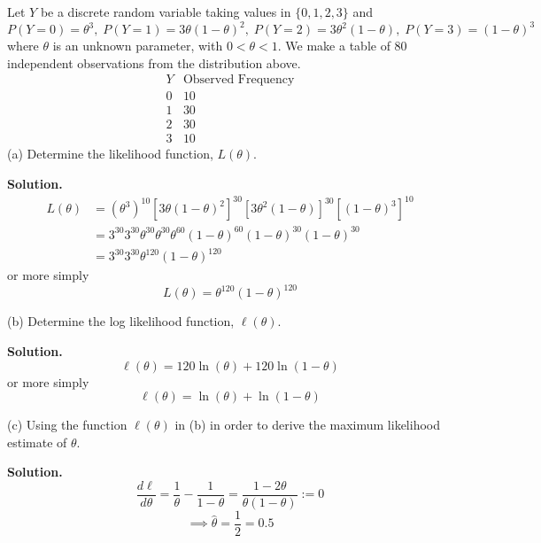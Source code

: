 \begin{exbox}
    \begin{example}
        Let $ Y $ be a discrete random variable taking values in $ \{0,1,2,3\} $ and
        \[ P(Y=0)=\theta^3,\; P(Y=1)=3\theta(1-\theta)^2,\;P(Y=2)=3\theta^2(1-\theta),\;
            P(Y=3)=(1-\theta)^3 \]
        where $ \theta $ is an unknown parameter, with $ 0<\theta<1 $.
        We make a table of $ 80 $ independent observations from the distribution above.
        \[
            \begin{array}{c|c}
                Y & \text{Observed Frequency} \\
                \hline
                0 & 10                        \\
                1 & 30                        \\
                2 & 30                        \\
                3 & 10
            \end{array}
        \]
        (a) Determine the likelihood function, $ L(\theta) $.

        \textbf{Solution.}
        \begin{align*}
            L(\theta)
             & =\left( \theta^3 \right)^{10}\left[ 3\theta(1-\theta)^2 \right]^{30}
            \left[ 3\theta^2(1-\theta) \right]^{30}\left[ (1-\theta)^3 \right]^{10}                        \\
             & =3^{30}3^{30}\theta^{30}\theta^{30}\theta^{60}(1-\theta)^{60}(1-\theta)^{30}(1-\theta)^{30} \\
             & =3^{30}3^{30}\theta^{120}(1-\theta)^{120}
        \end{align*}
        or more simply
        \[ L(\theta)=\theta^{120}(1-\theta)^{120} \]

        (b) Determine the log likelihood function, $ \ell(\theta) $.

        \textbf{Solution.}
        \[ \ell(\theta)=120\ln(\theta)+120\ln(1-\theta) \]
        or more simply
        \[ \ell(\theta)=\ln(\theta)+\ln(1-\theta) \]

        (c) Using the function $ \ell(\theta) $ in (b) in order to derive the maximum
        likelihood estimate of $ \theta $.

        \textbf{Solution.}
        \[ \frac{d\ell}{d\theta}=\frac{1}{\theta}-\frac{1}{1-\theta}=\frac{1-2\theta}{\theta(1-\theta)}:=0 \]
        \[ \implies \hat{\theta}=\frac{1}{2}=0.5 \]
    \end{example}
\end{exbox}

